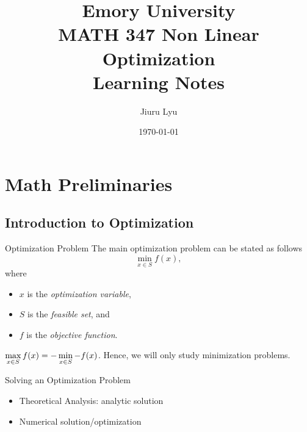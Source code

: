 

\title{Emory University\\\textbf{MATH 347 Non Linear Optimization}\\ Learning Notes}
\author{Jiuru Lyu}
\date{\today}


\maketitle

\tableofcontents
\newpage

\section{Math Preliminaries}
\subsection{Introduction to Optimization}
\begin{df}{Optimization Problem}
	The main optimization problem can be stated as follows \begin{equation}\label{eq1}\min_{x\in S}f(x),\end{equation} where 
	\begin{itemize}
		\item $x$ is the \textit{optimization variable},
		\item $S$ is the \textit{feasible set}, and 
		\item $f$ is the \textit{objective function}.
	\end{itemize}
\end{df}
\begin{rmk}
	$\displaystyle\max_{x\in S}f(x)=-\min_{x\in S}-f(x)$. Hence, we will only study minimization problems.
\end{rmk}
\begin{thm}{Solving an Optimization Problem}
	\begin{itemize}
		\item Theoretical Analysis: analytic solution
		\item Numerical solution/optimization
	\end{itemize}	
\end{thm}
